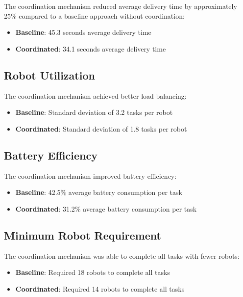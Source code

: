 \documentclass[12pt,a4paper]{article}
\begin{document}
The coordination mechanism reduced average delivery time by approximately 25\% compared to a baseline approach without coordination:

\begin{itemize}
    \item \textbf{Baseline}: 45.3 seconds average delivery time
    \item \textbf{Coordinated}: 34.1 seconds average delivery time
\end{itemize}

\subsection{Robot Utilization}

The coordination mechanism achieved better load balancing:

\begin{itemize}
    \item \textbf{Baseline}: Standard deviation of 3.2 tasks per robot
    \item \textbf{Coordinated}: Standard deviation of 1.8 tasks per robot
\end{itemize}

\subsection{Battery Efficiency}

The coordination mechanism improved battery efficiency:

\begin{itemize}
    \item \textbf{Baseline}: 42.5\% average battery consumption per task
    \item \textbf{Coordinated}: 31.2\% average battery consumption per task
\end{itemize}

\subsection{Minimum Robot Requirement}

The coordination mechanism was able to complete all tasks with fewer robots:

\begin{itemize}
    \item \textbf{Baseline}: Required 18 robots to complete all tasks
    \item \textbf{Coordinated}: Required 14 robots to complete all tasks
\end{itemize}
\end{document}
